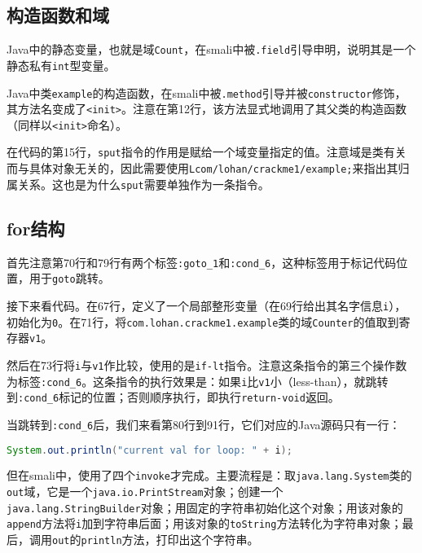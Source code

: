 \subsection{构造函数和域}



Java中的静态变量，也就是域\lstinline!Count!，在smali中被\lstinline!.field!引导申明，说明其是一个静态私有\lstinline!int!型变量。

Java中类\lstinline!example!的构造函数，在smali中被\lstinline!.method!引导并被\lstinline!constructor!修饰，其方法名变成了\lstinline!<init>!。注意在第12行，该方法显式地调用了其父类的构造函数（同样以\lstinline!<init>!命名）。

在代码的第15行，\lstinline!sput!指令的作用是赋给一个域变量指定的值。注意域是类有关而与具体对象无关的，因此需要使用\lstinline!Lcom/lohan/crackme1/example;!来指出其归属关系。这也是为什么\lstinline!sput!需要单独作为一条指令。

\subsection{for结构}
\label{SubSec:dalvik-smali-for}




首先注意第70行和79行有两个标签\lstinline!:goto_1!和\lstinline!:cond_6!，这种标签用于标记代码位置，用于\lstinline!goto!跳转。

接下来看代码。在67行，定义了一个局部整形变量（在69行给出其名字信息\lstinline!i!），初始化为\lstinline!0!。在71行，将\lstinline!com.lohan.crackme1.example!类的域\lstinline!Counter!的值取到寄存器\lstinline!v1!。

然后在73行将\lstinline!i!与\lstinline!v1!作比较，使用的是\lstinline!if-lt!指令。注意这条指令的第三个操作数为标签\lstinline!:cond_6!。这条指令的执行效果是：如果\lstinline!i!比\lstinline!v1!小（less-than），就跳转到\lstinline!:cond_6!标记的位置；否则顺序执行，即执行\lstinline!return-void!返回。

当跳转到\lstinline!:cond_6!后，我们来看第80行到91行，它们对应的Java源码只有一行：
\begin{lstlisting}[language=java, numbers=none]
System.out.println("current val for loop: " + i);
\end{lstlisting}
但在smali中，使用了四个\lstinline!invoke!才完成。主要流程是：取\lstinline!java.lang.System!类的\lstinline!out!域，它是一个\lstinline!java.io.PrintStream!对象；创建一个\lstinline!java.lang.StringBuilder!对象；用固定的字符串初始化这个对象；用该对象的\lstinline!append!方法将\lstinline!i!加到字符串后面；用该对象的\lstinline!toString!方法转化为字符串对象；最后，调用\lstinline!out!的\lstinline!println!方法，打印出这个字符串。

